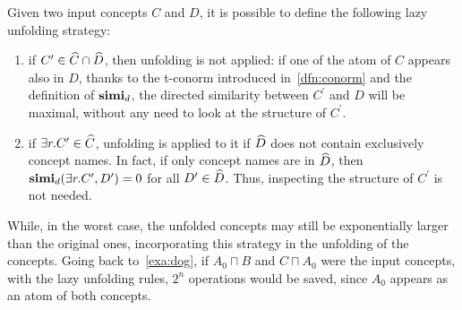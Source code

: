   Given two input concepts \(C\) and \(D\), it is possible to define the following lazy unfolding strategy:
  \begin{enumerate}
    \item if \(C^\prime \in \widehat{C} \cap \widehat{D}\), then unfolding is not applied: if one of the atom of \(C\) appears also in \(D\), thanks to the t-conorm introduced in~\cref{dfn:conorm} and the definition of \(\mathbf{simi}_d\), the directed similarity between \(C^\prime\) and \(D\) will be maximal, without any need to look at the structure of \(C^\prime\).
    \item if \(\exists{}r.C^\prime \in \widehat{C}\), unfolding is applied to it if \(\widehat{D}\) does not contain exclusively concept names. In fact, if only concept names are in \(\widehat{D}\), then \(\mathbf{simi}_d(\exists{}r.C^\prime,D^\prime) = 0\) for all \(D^\prime \in \widehat{D}\).
    Thus, inspecting the structure of \(C^\prime\) is not needed. 
  \end{enumerate}
  
  While, in the worst case, the unfolded concepts may still be exponentially larger than the original ones, incorporating this strategy in the unfolding of the concepts.
  Going back to~\cref{exa:dog}, if \(A_0 \sqcap B\) and \(C \sqcap A_0\) were the input concepts, with the lazy unfolding rules, \(2^n\) operations would be saved, since \(A_0\) appears as an atom of both concepts.
  
  